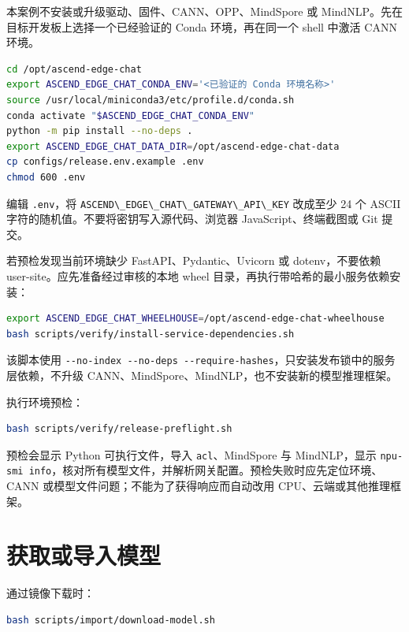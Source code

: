 本案例不安装或升级驱动、固件、CANN、OPP、MindSpore 或
MindNLP。先在目标开发板上选择一个已经验证的 Conda 环境，再在同一个 shell
中激活 CANN 环境。

\begin{lstlisting}[language=bash]
cd /opt/ascend-edge-chat
export ASCEND_EDGE_CHAT_CONDA_ENV='<已验证的 Conda 环境名称>'
source /usr/local/miniconda3/etc/profile.d/conda.sh
conda activate "$ASCEND_EDGE_CHAT_CONDA_ENV"
python -m pip install --no-deps .
export ASCEND_EDGE_CHAT_DATA_DIR=/opt/ascend-edge-chat-data
cp configs/release.env.example .env
chmod 600 .env
\end{lstlisting}

编辑 \passthrough{\lstinline!.env!}，将
\passthrough{\lstinline!ASCEND\_EDGE\_CHAT\_GATEWAY\_API\_KEY!} 改成至少
24 个 ASCII 字符的随机值。不要将密钥写入源代码、浏览器
JavaScript、终端截图或 Git 提交。

若预检发现当前环境缺少 FastAPI、Pydantic、Uvicorn 或 dotenv，不要依赖
user-site。应先准备经过审核的本地 wheel
目录，再执行带哈希的最小服务依赖安装：

\begin{lstlisting}[language=bash]
export ASCEND_EDGE_CHAT_WHEELHOUSE=/opt/ascend-edge-chat-wheelhouse
bash scripts/verify/install-service-dependencies.sh
\end{lstlisting}

该脚本使用
\passthrough{\lstinline!--no-index --no-deps --require-hashes!}，只安装发布锁中的服务层依赖，不升级
CANN、MindSpore、MindNLP，也不安装新的模型推理框架。

执行环境预检：

\begin{lstlisting}[language=bash]
bash scripts/verify/release-preflight.sh
\end{lstlisting}

预检会显示 Python 可执行文件，导入
\passthrough{\lstinline!acl!}、MindSpore 与 MindNLP，显示
\passthrough{\lstinline!npu-smi info!}，核对所有模型文件，并解析网关配置。预检失败时应先定位环境、CANN
或模型文件问题；不能为了获得响应而自动改用 CPU、云端或其他推理框架。

\section{获取或导入模型}\label{ux83b7ux53d6ux6216ux5bfcux5165ux6a21ux578b}

通过镜像下载时：

\begin{lstlisting}[language=bash]
bash scripts/import/download-model.sh
\end{lstlisting}

